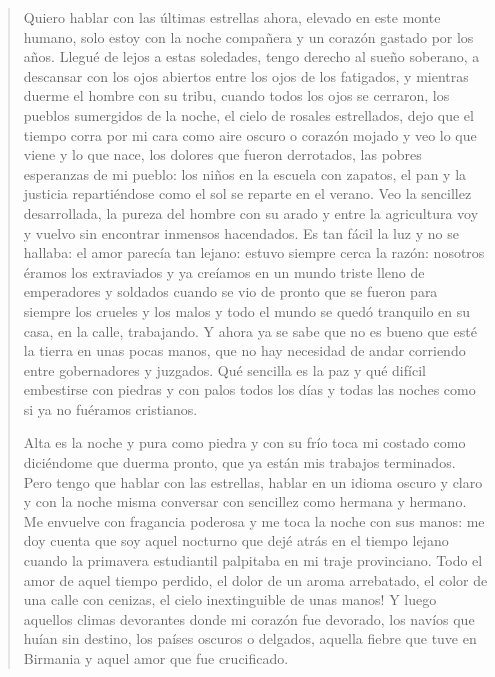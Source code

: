 \documentclass[12pt]{article}
\begin{document}
\clearpage
{}
\begin{verse}
Quiero hablar con las últimas estrellas  
ahora, elevado en este monte humano,  
solo estoy con la noche compañera  
y un corazón gastado por los años.  
Llegué de lejos a estas soledades,  
tengo derecho al sueño soberano,  
a descansar con los ojos abiertos  
entre los ojos de los fatigados,  
y mientras duerme el hombre con su tribu,  
cuando todos los ojos se cerraron,  
los pueblos sumergidos de la noche,  
el cielo de rosales estrellados,  
dejo que el tiempo corra por mi cara  
como aire oscuro o corazón mojado  
y veo lo que viene y lo que nace,  
los dolores que fueron derrotados,  
las pobres esperanzas de mi pueblo:  
los niños en la escuela con zapatos,  
el pan y la justicia repartiéndose  
como el sol se reparte en el verano.  
Veo la sencillez desarrollada,  
la pureza del hombre con su arado  
y entre la agricultura voy y vuelvo  
sin encontrar inmensos hacendados.  
Es tan fácil la luz y no se hallaba:  
el amor parecía tan lejano:  
estuvo siempre cerca la razón:  
nosotros éramos los extraviados  
y ya creíamos en un mundo triste  
lleno de emperadores y soldados  
cuando se vio de pronto que se fueron  
para siempre los crueles y los malos  
y todo el mundo se quedó tranquilo  
en su casa, en la calle, trabajando.  
Y ahora ya se sabe que no es bueno  
que esté la tierra en unas pocas manos,  
que no hay necesidad de andar corriendo  
entre gobernadores y juzgados.  
Qué sencilla es la paz y qué difícil  
embestirse con piedras y con palos  
todos los días y todas las noches  
como si ya no fuéramos cristianos.  

Alta es la noche y pura como piedra  
y con su frío toca mi costado  
como diciéndome que duerma pronto,  
que ya están mis trabajos terminados.  
Pero tengo que hablar con las estrellas,  
hablar en un idioma oscuro y claro  
y con la noche misma conversar  
con sencillez como hermana y hermano.  
Me envuelve con fragancia poderosa  
y me toca la noche con sus manos:  
me doy cuenta que soy aquel nocturno  
que dejé atrás en el tiempo lejano  
cuando la primavera estudiantil  
palpitaba en mi traje provinciano.  
Todo el amor de aquel tiempo perdido,  
el dolor de un aroma arrebatado,  
el color de una calle con cenizas,  
el cielo inextinguible de unas manos!  
Y luego aquellos climas devorantes  
donde mi corazón fue devorado,  
los navíos que huían sin destino,  
los países oscuros o delgados,  
aquella fiebre que tuve en Birmania  
y aquel amor que fue crucificado.  


\end{verse}
\end{document}
